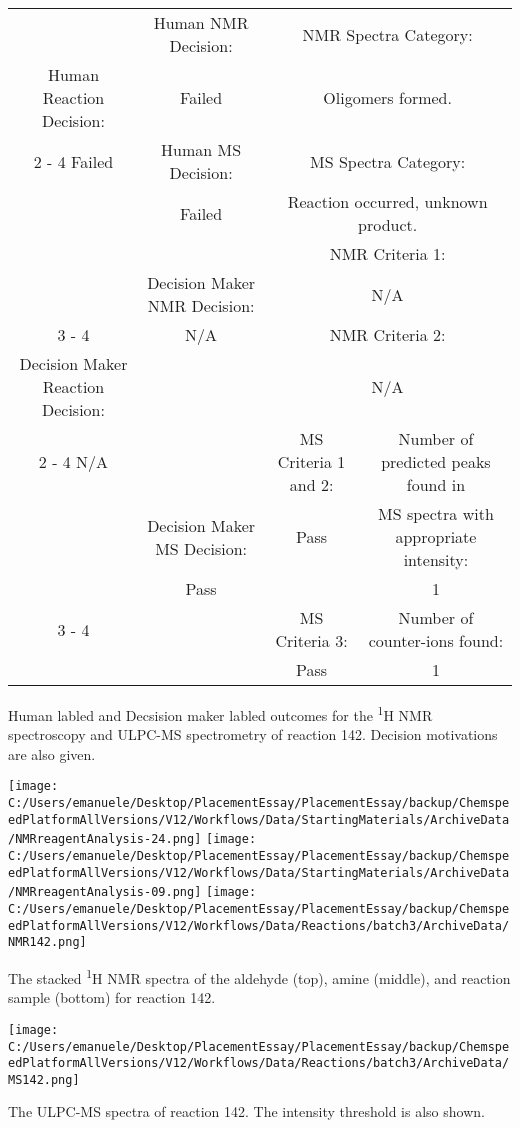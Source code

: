 \documentclass{article}%
\begin{document}
\begin{Decision Table}[H]%
\begin{tabular}{|c|c|c|c|}%
\hline%
&Human NMR Decision:&\multicolumn{2}{|c|}{NMR Spectra Category:}\\%
Human Reaction Decision:&Failed&\multicolumn{2}{|c|}{Oligomers formed.}\\%
\cline{2%
-%
4}%
Failed&Human MS Decision:&\multicolumn{2}{|c|}{MS Spectra Category:}\\%
&Failed&\multicolumn{2}{|c|}{Reaction occurred, unknown product.}\\%
\hline%
&&\multicolumn{2}{|c|}{NMR Criteria 1:}\\%
&Decision Maker NMR Decision:&\multicolumn{2}{|c|}{N/A}\\%
\cline{3%
-%
4}%
&N/A&\multicolumn{2}{|c|}{NMR Criteria 2:}\\%
Decision Maker Reaction Decision:&&\multicolumn{2}{|c|}{N/A}\\%
\cline{2%
-%
4}%
N/A&&MS Criteria 1 and 2:&Number of predicted peaks found in\\%
&Decision Maker MS Decision:&Pass&MS spectra with appropriate intensity:\\%
&Pass&&1\\%
\cline{3%
-%
4}%
&&MS Criteria 3:&Number of counter{-}ions found:\\%
&&Pass&1\\%
\hline%
\end{tabular}%
\caption{Human labled and Decsision maker labled outcomes for the \textsuperscript{1}H NMR spectroscopy and ULPC-MS spectrometry of reaction 142. Decision motivations are also given.}%
\end{Decision Table}%
\begin{NMR Spectra}[H]%
\begin{center}%
\texttt{[image: C:/Users/emanuele/Desktop/PlacementEssay/PlacementEssay/backup/ChemspeedPlatformAllVersions/V12/Workflows/Data/StartingMaterials/ArchiveData/NMRreagentAnalysis-24.png]}\hfill%
\texttt{[image: C:/Users/emanuele/Desktop/PlacementEssay/PlacementEssay/backup/ChemspeedPlatformAllVersions/V12/Workflows/Data/StartingMaterials/ArchiveData/NMRreagentAnalysis-09.png]}\hfill%
\texttt{[image: C:/Users/emanuele/Desktop/PlacementEssay/PlacementEssay/backup/ChemspeedPlatformAllVersions/V12/Workflows/Data/Reactions/batch3/ArchiveData/NMR142.png]}\hfill%
\end{center}%
\caption{The stacked \textsuperscript{1}H NMR spectra of the aldehyde (top), amine (middle), and reaction sample (bottom) for reaction 142.}%
\end{NMR Spectra}%
\begin{MS Spectra}[H]%
\begin{center}%
\texttt{[image: C:/Users/emanuele/Desktop/PlacementEssay/PlacementEssay/backup/ChemspeedPlatformAllVersions/V12/Workflows/Data/Reactions/batch3/ArchiveData/MS142.png]}\hfill%
\end{center}%
\caption{The ULPC-MS spectra of reaction 142. The intensity threshold is also shown.}%
\end{MS Spectra}%
\end{document}
